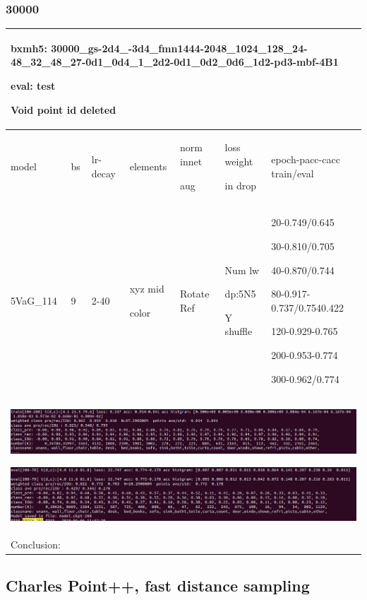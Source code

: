 \documentclass{article}
\begin{document}
\subsubsection{30000}
\begin{tabular}{|p{1.5cm}|p{1.5cm}|p{1cm}|p{1.5cm}|p{1.5cm}|p{1.5cm}|p{5cm}| }
	\hline
	\multicolumn{7}{|p{14cm}|}{bxmh5: 30000\_gs-2d4\_-3d4\_fmn1444-2048\_1024\_128\_24-48\_32\_48\_27-0d1\_0d4\_1\_2d2-0d1\_0d2\_0d6\_1d2-pd3-mbf-4B1  \par eval: test \par Void point id deleted} \\
	\hline
	model & bs& lr-decay & elements & norm innet\par aug & loss weight\par in drop & epoch-pacc-cacc train/eval \\
	\hline
	
	5VaG\_114 & 9 &2-40 & xyz mid\par color & Rotate Ref & Num lw\par dp:5N5\par Y shuffle & 20-0.749/0.645\par 30-0.810/0.705\par 40-0.870/0.744\par 80-0.917-0.737/0.7540.422\par 120-0.929-0.765\par 200-0.953-0.774\par 300-0.962/0.774\\
	\hline
	\multicolumn{7}{|p{14cm}|}{ \includegraphics[width=\textheight]{images/svoxel/novoid/train} \par 
	\includegraphics[width=\textheight]{images/svoxel/novoid/test}} \\
	\hline
	
	\multicolumn{7}{|p{14cm}|}{ Conclusion:\par	 } \\
	\hline
\end{tabular}

\subsection{Charles Point++, fast distance sampling}	
\end{document}
